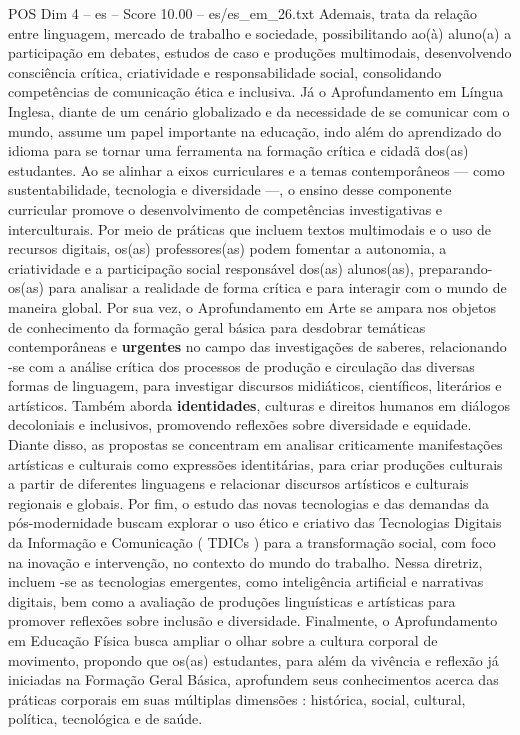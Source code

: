 \begin{textsample}{POS Dim 4 – es – Score 10.00 – es/es\_em\_26.txt}
Ademais, trata da relação entre linguagem, mercado de trabalho e sociedade, possibilitando ao(à) aluno(a) a participação em debates, estudos de caso e produções multimodais, desenvolvendo consciência crítica, criatividade e responsabilidade social, consolidando competências de comunicação ética e inclusiva.
Já o Aprofundamento em Língua Inglesa, diante de um cenário globalizado e da necessidade de se comunicar com o mundo, assume um papel importante na educação, indo além do aprendizado do idioma para se tornar uma ferramenta na formação crítica e cidadã dos(as) estudantes.
Ao se alinhar a eixos curriculares e a temas contemporâneos — como sustentabilidade, tecnologia e diversidade —, o ensino desse componente curricular promove o desenvolvimento de competências investigativas e interculturais.
Por meio de práticas que incluem textos multimodais e o uso de recursos digitais, os(as) professores(as) podem fomentar a autonomia, a criatividade e a participação social responsável dos(as) alunos(as), preparando-os(as) para analisar a realidade de forma crítica e para interagir com o mundo de maneira global.
Por sua vez, o Aprofundamento em Arte se ampara nos objetos de conhecimento da formação geral básica para desdobrar temáticas contemporâneas e \textbf{urgentes} no campo das investigações de saberes, relacionando -se com a análise crítica dos processos de produção e circulação das diversas formas de linguagem, para investigar discursos midiáticos, científicos, literários e artísticos.
Também aborda \textbf{identidades}, culturas e direitos humanos em diálogos decoloniais e inclusivos, promovendo reflexões sobre diversidade e equidade.
Diante disso, as propostas se concentram em analisar criticamente manifestações artísticas e culturais como expressões identitárias, para criar produções culturais a partir de diferentes linguagens e relacionar discursos artísticos e culturais regionais e globais.
Por fim, o estudo das novas tecnologias e das demandas da pós-modernidade buscam explorar o uso ético e criativo das Tecnologias Digitais da Informação e Comunicação ( TDICs ) para a transformação social, com foco na inovação e intervenção, no contexto do mundo do trabalho.
Nessa diretriz, incluem -se as tecnologias emergentes, como inteligência artificial e narrativas digitais, bem como a avaliação de produções linguísticas e artísticas para promover reflexões sobre inclusão e diversidade.
Finalmente, o Aprofundamento em Educação Física busca ampliar o olhar sobre a cultura corporal de movimento, propondo que os(as) estudantes, para além da vivência e reflexão já iniciadas na Formação Geral Básica, aprofundem seus conhecimentos acerca das práticas corporais em suas múltiplas dimensões : histórica, social, cultural, política, tecnológica e de saúde.

\end{textsample}
